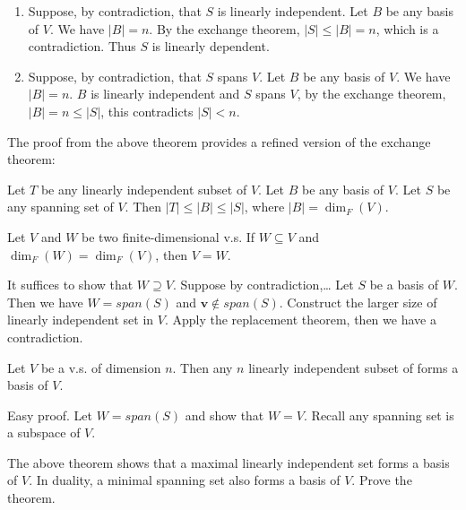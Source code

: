 \documentclass[12pt]{article}
\begin{document}
\begin{pfbox}  
    \begin{enumerate}
    \item Suppose, by contradiction, that $S$ is linearly independent. 
    Let $B$ be any basis of $V$. We have $|B|=n$.
    By the exchange theorem, $|S|\leq|B|=n$, which is a contradiction.
    Thus $S$ is linearly dependent.
    \item Suppose, by contradiction, that $S$ spans $V$.
    Let $B$ be any basis of $V$. We have $|B|=n$.
    $B$ is linearly independent and $S$ spans $V$,
    by the exchange theorem, $|B|=n\leq|S|$, this contradicts $|S|<n$.
    \end{enumerate}
\end{pfbox}


The proof from the above theorem provides a refined version of the exchange theorem:
\begin{theorem}
Let $T$ be any linearly independent subset of $V$.
Let $B$ be any basis of $V$.
Let $S$ be any spanning set of $V$.
Then $|T|\leq|B|\leq|S|$, where $|B|=\dim_F(V)$.
\end{theorem}

\begin{theorem}
    Let $V$ and $W$ be two finite-dimensional v.s. If $W\subseteq V$ and $\dim_F(W)=\dim_F(V)$,
    then $V=W$.
\end{theorem}


\begin{pfbox}  
It suffices to show that $W\supseteq V$.
Suppose by contradiction,\dots
Let $S$ be a basis of $W$. Then we have $W=span(S)$ and
$\mathbf{v}\notin span(S)$. Construct the larger size of linearly independent set in $V$.
Apply the replacement theorem, then we have a contradiction.
\end{pfbox}



\begin{theorem}
    Let $V$ be a v.s. of dimension $n$.
    Then any $n$ linearly independent subset of forms a basis of $V$.
\end{theorem}

\begin{pfbox}
Easy proof.
Let $W=span(S)$ and show that $W=V$.
Recall any spanning set is a subspace of $V$.
\end{pfbox}

\begin{exercise}
    The above theorem shows that a maximal linearly independent set forms a basis of $V$.
    In duality, a minimal spanning set also forms a basis of $V$. Prove the theorem.
\end{exercise}
\end{document}
